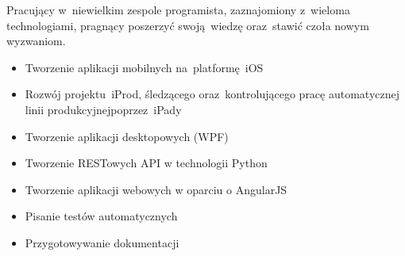 \documentclass[11pt,a4paper]{article}
\begin{document}
    \bigskip

  
    \smallskip

    \noindent
    Pracujący w~niewielkim zespole programista, zaznajomiony z~wieloma technologiami, pragnący poszerzyć swoją~wiedzę oraz~stawić czoła nowym wyzwaniom.
  

    \bigskip


    \smallskip

    \vspace{-0.2cm}
    \begin{itemize} \itemsep1pt \parskip0pt 
        \item Tworzenie aplikacji mobilnych na~platformę~iOS
        \item Rozwój projektu~iProd, śledzącego oraz~kontrolującego pracę automatycznej linii produkcyjnej\linebreak poprzez~iPady
        \item Tworzenie aplikacji desktopowych (WPF)
        \item Tworzenie RESTowych API w technologii Python
        \item Tworzenie aplikacji webowych w oparciu o AngularJS
        \item Pisanie testów automatycznych
        \item Przygotowywanie dokumentacji
    \end{itemize}


    \medskip
  
  
    \smallskip
\end{document}
